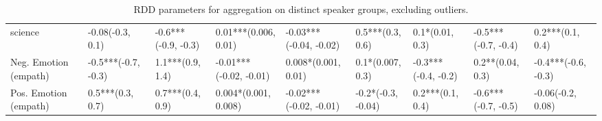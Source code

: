 \begin{table}[h]
\begin{adjustbox}{width=\linewidth, center}
\begin{tabular}{lllllllll}
	science               &     -0.08(-0.3, 0.1) &  -0.6***(-0.9, -0.3) &      0.01***(0.006, 0.01) &  -0.03***(-0.04, -0.02) &     0.5***(0.3, 0.6) &      0.1*(0.01, 0.3) &  -0.5***(-0.7, -0.4) &     0.2***(0.1, 0.4) \\
	Neg. Emotion (empath) &  -0.5***(-0.7, -0.3) &     1.1***(0.9, 1.4) &    -0.01***(-0.02, -0.01) &     0.008*(0.001, 0.01) &     0.1*(0.007, 0.3) &  -0.3***(-0.4, -0.2) &     0.2**(0.04, 0.3) &  -0.4***(-0.6, -0.3) \\
	Pos. Emotion (empath) &     0.5***(0.3, 0.7) &     0.7***(0.4, 0.9) &      0.004*(0.001, 0.008) &  -0.02***(-0.02, -0.01) &   -0.2*(-0.3, -0.04) &     0.2***(0.1, 0.4) &  -0.6***(-0.7, -0.5) &    -0.06(-0.2, 0.08) \\
	\bottomrule
	\end{tabular}
	
\end{adjustbox}
	\caption{RDD parameters for aggregation on distinct speaker groups, excluding outliers.}
	\label{fig: Attributes_2}
\end{table}


